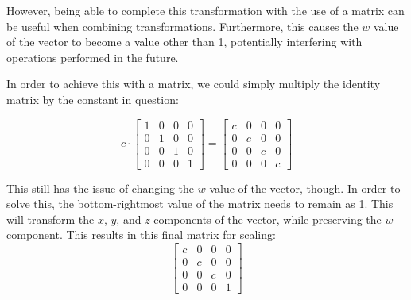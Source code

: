 \documentclass{article}
\begin{document}
	However, being able to complete this transformation with the use of a matrix can be useful when combining transformations. Furthermore, this causes the $w$ value of the vector to become a value other than 1, potentially interfering with operations performed in the future.\par

	In order to achieve this with a matrix, we could simply multiply the identity matrix by the constant in question: \par

	\[
		c \cdot
		\begin{bmatrix}
			1 & 0 & 0 & 0 \\
			0 & 1 & 0 & 0 \\
			0 & 0 & 1 & 0 \\
			0 & 0 & 0 & 1
		\end{bmatrix}
		=
		\begin{bmatrix}
			c & 0 & 0 & 0 \\
			0 & c & 0 & 0 \\
			0 & 0 & c & 0 \\
			0 & 0 & 0 & c
		\end{bmatrix}
	\]

	This still has the issue of changing the $w$-value of the vector, though. In order to solve this, the bottom-rightmost value of the matrix needs to remain as 1. This will transform the $x$, $y$, and $z$ components of the vector, while preserving the $w$ component. This results in this final matrix for scaling:
	\[
		\begin{bmatrix}
			c & 0 & 0 & 0 \\
			0 & c & 0 & 0 \\
			0 & 0 & c & 0 \\
			0 & 0 & 0 & 1
		\end{bmatrix}
	\]
\end{document}
